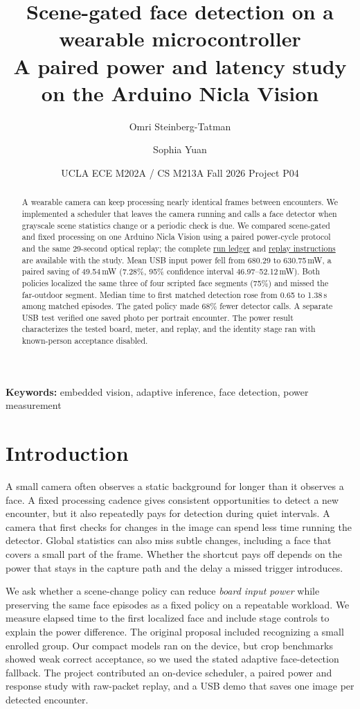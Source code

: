\documentclass[10pt,letterpaper,twocolumn]{article}
\title{\vspace{-1.7em}\textbf{Scene-gated face detection on a wearable microcontroller}\\[-1pt]
{\large A paired power and latency study on the Arduino Nicla Vision}}
\author{Omri Steinberg-Tatman \and Sophia Yuan}
\date{\small UCLA ECE M202A / CS M213A \quad Fall 2026 \quad Project P04}
\begin{document}
\maketitle

\begin{abstract}
A wearable camera can keep processing nearly identical frames between encounters. We implemented a scheduler that leaves the camera running and calls a face detector when grayscale scene statistics change or a periodic check is due. We compared scene-gated and fixed processing on one Arduino Nicla Vision using a paired power-cycle protocol and the same 29-second optical replay; the complete \href{https://github.com/sophiayuanproj/FaceRecognition/blob/main/paper/data/final-block-ledger.csv}{run ledger} and \href{https://github.com/sophiayuanproj/FaceRecognition/blob/main/evidence/README.md}{replay instructions} are available with the study. Mean USB input power fell from 680.29 to 630.75\,mW, a paired saving of 49.54\,mW (7.28\%, 95\% confidence interval 46.97--52.12\,mW). Both policies localized the same three of four scripted face segments (75\%) and missed the far-outdoor segment. Median time to first matched detection rose from 0.65 to 1.38\,s among matched episodes. The gated policy made 68\% fewer detector calls. A separate USB test verified one saved photo per portrait encounter. The power result characterizes the tested board, meter, and replay, and the identity stage ran with known-person acceptance disabled.
\end{abstract}
\par\noindent\textbf{Keywords:} embedded vision, adaptive inference, face detection, power measurement

\section{Introduction}
A small camera often observes a static background for longer than it observes a face. A fixed processing cadence gives consistent opportunities to detect a new encounter, but it also repeatedly pays for detection during quiet intervals. A camera that first checks for changes in the image can spend less time running the detector. Global statistics can also miss subtle changes, including a face that covers a small part of the frame. Whether the shortcut pays off depends on the power that stays in the capture path and the delay a missed trigger introduces.

We ask whether a scene-change policy can reduce \emph{board input power} while preserving the same face episodes as a fixed policy on a repeatable workload. We measure elapsed time to the first localized face and include stage controls to explain the power difference. The original proposal included recognizing a small enrolled group. Our compact models ran on the device, but crop benchmarks showed weak correct acceptance, so we used the stated adaptive face-detection fallback. The project contributed an on-device scheduler, a paired power and response study with raw-packet replay, and a USB demo that saves one image per detected encounter.
\end{document}

